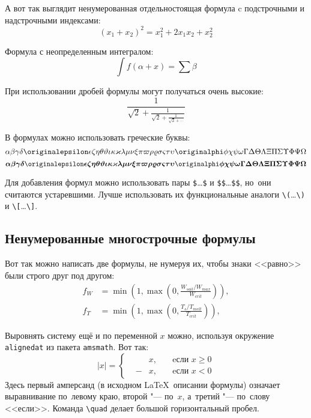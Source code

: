 А вот так выглядит ненумерованная отдельностоящая формула c подстрочными
и надстрочными индексами:
\[
    (x_1+x_2)^2 = x_1^2 + 2 x_1 x_2 + x_2^2
\]

Формула с неопределенным интегралом:
\[
    \int f(\alpha+x)=\sum\beta
\]

При использовании дробей формулы могут получаться очень высокие:
\[
    \frac{1}{\sqrt{2}+
        \displaystyle\frac{1}{\sqrt{2}+
            \displaystyle\frac{1}{\sqrt{2}+\cdots}}}
\]

В формулах можно использовать греческие буквы:
\[
    \alpha\beta\gamma\delta\originalepsilon\epsilon\zeta\eta\theta%
    \vartheta\iota\kappa\varkappa\lambda\mu\nu\xi\pi\varpi\rho\varrho%
    \sigma\varsigma\tau\upsilon\originalphi\phi\chi\psi\omega\Gamma\Delta%
    \Theta\Lambda\Xi\Pi\Sigma\Upsilon\Phi\Psi\Omega
\]
\[%
    \boldsymbol{\alpha\beta\gamma\delta\originalepsilon\epsilon\zeta\eta%
        \theta\vartheta\iota\kappa\varkappa\lambda\mu\nu\xi\pi\varpi\rho%
        \varrho\sigma\varsigma\tau\upsilon\originalphi\phi\chi\psi\omega\Gamma%
        \Delta\Theta\Lambda\Xi\Pi\Sigma\Upsilon\Phi\Psi\Omega}
\]

Для добавления формул можно использовать пары \verb+$+\dots\verb+$+ и \verb+$$+\dots\verb+$$+,
но~они считаются устаревшими.
Лучше использовать их функциональные аналоги \verb+\(+\dots\verb+\)+ и \verb+\[+\dots\verb+\]+.

\subsection{Ненумерованные многострочные формулы}\label{subsec:ch1/sec3/sub2}

Вот так можно написать две формулы, не нумеруя их, чтобы знаки <<равно>> были
строго друг под другом:
\begin{align}
    f_W & =  \min \left( 1, \max \left( 0, \frac{W_{soil} / W_{max}}{W_{crit}} \right)  \right), \nonumber \\
    f_T & =  \min \left( 1, \max \left( 0, \frac{T_s / T_{melt}}{T_{crit}} \right)  \right), \nonumber
\end{align}

Выровнять систему ещё и по переменной \( x \) можно, используя окружение
\verb|alignedat| из пакета \verb|amsmath|. Вот так:
\[
|x| = \left\{
\begin{alignedat}{2}
    &&x, \quad &\text{eсли } x\geqslant 0 \\
    &-&x, \quad & \text{eсли } x<0
\end{alignedat}
\right.
\]
Здесь первый амперсанд (в исходном \LaTeX\ описании формулы) означает
выравнивание по~левому краю, второй "--- по~\( x \), а~третий "--- по~слову
<<если>>. Команда \verb|\quad| делает большой горизонтальный пробел.

